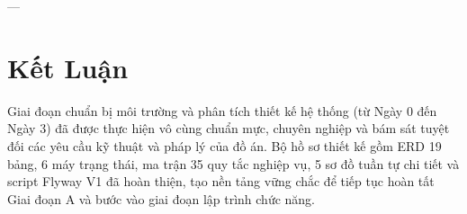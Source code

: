 \documentclass[a4paper]{article}
\begin{document}
---

\section{Kết Luận}
Giai đoạn chuẩn bị môi trường và phân tích thiết kế hệ thống (từ Ngày 0 đến Ngày 3) đã được thực hiện vô cùng chuẩn mực, chuyên nghiệp và bám sát tuyệt đối các yêu cầu kỹ thuật và pháp lý của đồ án. Bộ hồ sơ thiết kế gồm ERD 19 bảng, 6 máy trạng thái, ma trận 35 quy tắc nghiệp vụ, 5 sơ đồ tuần tự chi tiết và script Flyway V1 đã hoàn thiện, tạo nền tảng vững chắc để tiếp tục hoàn tất Giai đoạn A và bước vào giai đoạn lập trình chức năng.
\end{document}
